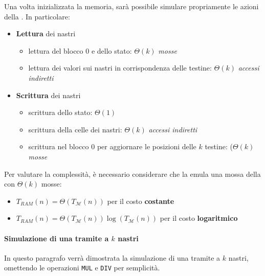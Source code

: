 \documentclass[italian, 10pt]{article}
\begin{document}
Una volta inizializzata la memoria, sarà possibile simulare propriamente le azioni della \TM.
In particolare:

\begin{itemize}
  \item \textbf{Lettura} dei nastri
        \begin{itemize}
          \item lettura del blocco \(0\) e dello stato: \(\Theta(k)\) \textit{mosse}
          \item lettura dei valori sui nastri in corrispondenza delle testine: \(\Theta(k)\) \textit{accessi indiretti}
        \end{itemize}
  \item \textbf{Scrittura} dei nastri
        \begin{itemize}
          \item scrittura dello stato: \(\Theta(1)\)
          \item scrittura della celle dei nastri: \(\Theta(k)\) \textit{accessi indiretti}
          \item scrittura nel blocco \(0\) per aggiornare le posizioni delle \(k\) testine: (\(\Theta(k)\) \textit{mosse}
        \end{itemize}
\end{itemize}

Per valutare la complessità, è necessario considerare che la \RAM emula una mossa della \TM con \(\Theta(k)\) mosse:

\begin{itemize}
  \item \(T_{RAM}(n) = \Theta\left(T_{\mathscr{M}}(n)\right)\) per il costo \textbf{costante}
  \item \(T_{RAM}(n) = \Theta\left(T_{\mathscr{M}}(n)\right) \log\left(T_{\mathscr{M}}(n)\right)\) per il costo \textbf{logaritmico}
\end{itemize}

\paragraph[Simulazione di una \RAM nastri tramite \TM a k nastri]{Simulazione di una \RAM tramite \TM a \(k\) nastri}

In questo paragrafo verrà dimostrata la simulazione di una \RAM tramite \TM a \(k\) nastri, omettendo le operazioni \texttt{MUL} e \texttt{DIV} per semplicità.
\end{document}

